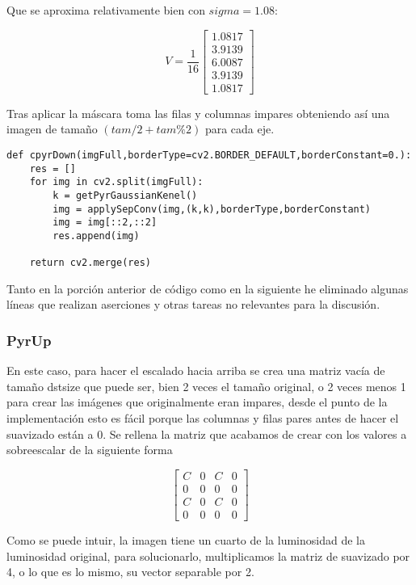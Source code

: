 \documentclass{article}
\begin{document}
Que se aproxima relativamente bien con $sigma=1.08$:

\[V=\frac{1}{16} \begin{bmatrix} 1.0817 \\ 3.9139 \\ 6.0087 \\ 3.9139 \\ 1.0817 \end{bmatrix}\]

Tras aplicar la máscara toma las filas y columnas impares obteniendo así una imagen de tamaño $(tam/2+tam\%2)$ para cada eje.

\begin{lstlisting}
def cpyrDown(imgFull,borderType=cv2.BORDER_DEFAULT,borderConstant=0.):
    res = []
    for img in cv2.split(imgFull):
        k = getPyrGaussianKenel()
        img = applySepConv(img,(k,k),borderType,borderConstant)
        img = img[::2,::2]
        res.append(img)

    return cv2.merge(res)
\end{lstlisting}

Tanto en la porción anterior de código como en la siguiente he eliminado algunas líneas que realizan aserciones y otras tareas no relevantes para la discusión.

\subsubsection{PyrUp}

En este caso, para hacer el escalado hacia arriba se crea una matriz vacía de tamaño dstsize que puede ser, bien 2 veces el tamaño original, o 2 veces menos 1 para crear las imágenes que originalmente eran impares, desde el punto de la implementación esto es fácil porque las columnas y filas pares antes de hacer el suavizado están a 0. Se rellena la matriz que acabamos de crear con los valores a sobreescalar de la siguiente forma

\[ \begin{bmatrix}
	C & 0 & C & 0 \\
	0 & 0 & 0 & 0 \\
	C & 0 & C & 0 \\
	0 & 0 & 0 & 0
\end{bmatrix}\]

Como se puede intuir, la imagen tiene un cuarto de la luminosidad de la luminosidad original, para solucionarlo, multiplicamos la matriz de suavizado por 4, o lo que es lo mismo, su vector separable por 2.
\end{document}
